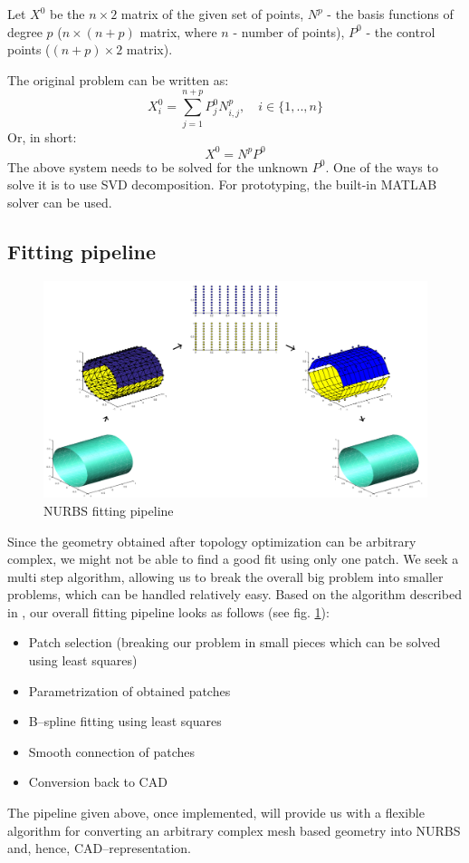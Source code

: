 Let $X^{0}$ be the $n \times 2$ matrix of the given set of points, $N^{p}$ - the basis functions of degree $p$ ($n \times (n+p)$ matrix, where $n$ - number of points), $P^{0}$ - the control points ($(n+p) \times 2$ matrix).

The original problem can be written as:
\begin{equation}
X_{i}^{0} = \sum\limits_{j=1}^{n+p} P_{j}^{0} N_{i,j}^{p}, \quad i \in \{1,..,n\}
\end{equation}
Or, in short:
\begin{equation}
X^{0} = N^{p} P^{0}
\end{equation}
The above system needs to be solved for the unknown $P^{0}$. One of the ways to solve it is to use SVD decomposition. For prototyping, the built-in MATLAB solver can be used.

\subsection{Fitting pipeline}
\begin{figure}
\centering
  \includegraphics[width=.85\linewidth]{Fitting_workflow.png}
  \caption{NURBS fitting pipeline}
  \label{fig:fitting_pipeline}
\end{figure}
Since the geometry obtained after topology optimization can be arbitrary complex, we might not be able to find a good fit using only one patch. We seek a multi step algorithm, allowing us to break the overall big problem into smaller problems, which can be handled relatively easy.
Based on the algorithm described in \cite{eck1996automatic}, our overall fitting pipeline looks as follows (see fig. \ref{fig:fitting_pipeline}):
\begin{itemize}
	\item Patch selection (breaking our problem in small pieces which can be solved using least squares)
	\item Parametrization of obtained patches
	\item B--spline fitting using least squares
	\item Smooth connection of patches
	\item Conversion back to CAD
\end{itemize}

The pipeline given above, once implemented, will provide us with a flexible algorithm for converting an arbitrary complex mesh based geometry into NURBS and, hence, CAD--representation.
